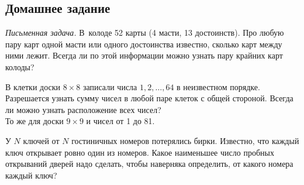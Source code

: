

\subsection*{Домашнее задание}



\begin{problems}

\item\emph{Письменная задача.}
В~колоде 52 карты (4 масти, 13 достоинств).
Про любую пару карт одной масти или одного достоинства известно, сколько карт
между ними лежит.
Всегда ли по этой информации можно узнать пару крайних карт колоды?

\item
\sp
В клетки доски $8 \times 8$ записали числа $1, 2, \ldots, 64$ в неизвестном
порядке.
Разрешается узнать сумму чисел в любой паре клеток с общей стороной.
Всегда ли можно узнать расположение всех чисел?
\\
\sp
То же для доски $9 \times 9$ и чисел от 1 до 81.

\item
У $N$ ключей от $N$ гостиничных номеров потерялись бирки.
Известно, что каждый ключ открывает ровно один из номеров.
Какое наименьшее число пробных открываний дверей надо сделать, чтобы наверняка
определить, от какого номера каждый ключ?

\end{problems}

